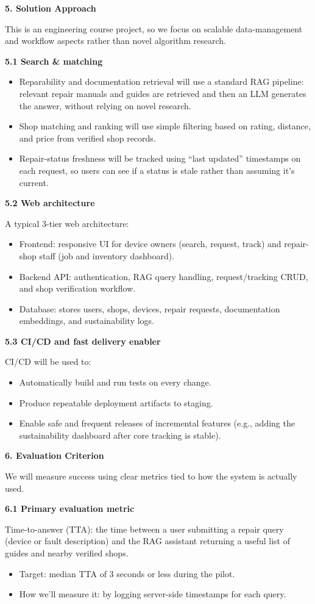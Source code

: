 \documentclass[11pt]{article}
\newcommand{\sechead}[2]{%
  \vspace{0.35cm}\noindent
  {\large\bfseries #1}\hfill{\large\itshape #2}\par
  \vspace{0.15cm}
}
\newcommand{\secheadonly}[1]{%
  \vspace{0.35cm}\noindent
  {\large\bfseries #1}\par
  \vspace{0.15cm}
}
\begin{document}
\sechead{5. Solution Approach}{}
This is an engineering course project, so we focus on scalable data-management and workflow aspects rather than novel algorithm research.

\sechead{5.1 Search \& matching}{}
\begin{itemize}
  \item Reparability and documentation retrieval will use a standard RAG pipeline: relevant repair manuals and guides are retrieved and then an LLM generates the answer, without relying on novel research.
  \item Shop matching and ranking will use simple filtering based on rating, distance, and price from verified shop records.
  \item Repair-status freshness will be tracked using ``last updated'' timestamps on each request, so users can see if a status is stale rather than assuming it's current.
\end{itemize}

\sechead{5.2 Web architecture}{}
A typical 3-tier web architecture:
\begin{itemize}
  \item Frontend: responsive UI for device owners (search, request, track) and repair-shop staff (job and inventory dashboard).
  \item Backend API: authentication, RAG query handling, request/tracking CRUD, and shop verification workflow.
  \item Database: stores users, shops, devices, repair requests, documentation embeddings, and sustainability logs.
\end{itemize}

\secheadonly{5.3 CI/CD and fast delivery enabler}
CI/CD will be used to:
\begin{itemize}
  \item Automatically build and run tests on every change.
  \item Produce repeatable deployment artifacts to staging.
  \item Enable safe and frequent releases of incremental features (e.g., adding the sustainability dashboard after core tracking is stable).
\end{itemize}

\sechead{6. Evaluation Criterion}{}
We will measure success using clear metrics tied to how the system is actually used.

\secheadonly{6.1 Primary evaluation metric}
Time-to-answer (TTA): the time between a user submitting a repair query (device or fault description) and the RAG assistant returning a useful list of guides and nearby verified shops.
\begin{itemize}
  \item Target: median TTA of 3 seconds or less during the pilot.
  \item How we'll measure it: by logging server-side timestamps for each query.
\end{itemize}
\end{document}
